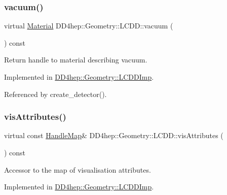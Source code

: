 \subsubsection{\texorpdfstring{vacuum()}{vacuum()}}
{\footnotesize\ttfamily virtual \hyperlink{class_d_d4hep_1_1_geometry_1_1_material}{Material} D\+D4hep\+::\+Geometry\+::\+L\+C\+D\+D\+::vacuum (\begin{DoxyParamCaption}{ }\end{DoxyParamCaption}) const\hspace{0.3cm}{\ttfamily [pure virtual]}}



Return handle to material describing vacuum. 



Implemented in \hyperlink{class_d_d4hep_1_1_geometry_1_1_l_c_d_d_imp_a9698f9c67fb45a886df6bfd7b2473bfe}{D\+D4hep\+::\+Geometry\+::\+L\+C\+D\+D\+Imp}.



Referenced by create\+\_\+detector().

\hypertarget{class_d_d4hep_1_1_geometry_1_1_l_c_d_d_abb60505e37d62147725d126cb21d171b}{}\label{class_d_d4hep_1_1_geometry_1_1_l_c_d_d_abb60505e37d62147725d126cb21d171b} 
\subsubsection{\texorpdfstring{vis\+Attributes()}{visAttributes()}\hspace{0.1cm}{\footnotesize\ttfamily [1/2]}}
{\footnotesize\ttfamily virtual const \hyperlink{class_d_d4hep_1_1_geometry_1_1_l_c_d_d_a05cb11e7355772c7b0794bcca59bf477}{Handle\+Map}\& D\+D4hep\+::\+Geometry\+::\+L\+C\+D\+D\+::vis\+Attributes (\begin{DoxyParamCaption}{ }\end{DoxyParamCaption}) const\hspace{0.3cm}{\ttfamily [pure virtual]}}



Accessor to the map of visualisation attributes. 



Implemented in \hyperlink{class_d_d4hep_1_1_geometry_1_1_l_c_d_d_imp_a7df9209e12c5e72b432351ee9c9dfcf0}{D\+D4hep\+::\+Geometry\+::\+L\+C\+D\+D\+Imp}.



